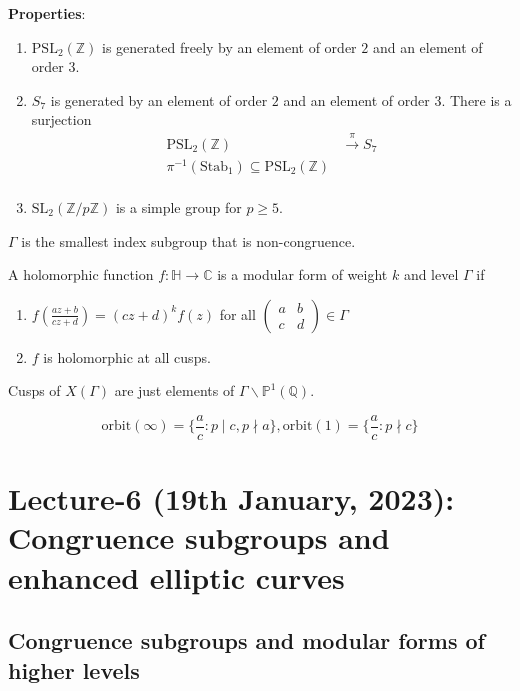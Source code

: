 \documentclass[oneside, 12pt]{scrbook}
\newcommand{\CC}{\mathbb C}
\newcommand{\QQ}{\mathbb Q}
\newcommand{\ZZ}{\mathbb Z}
\newcommand{\PP}{\mathbb{P}}
\newcommand{\SL}{\mathrm{SL}}
\theoremstyle{theorem}
\begin{document}
\textbf{Properties}:
\begin{enumerate}
\item $\mathrm{PSL}_{2}(\ZZ)$ is generated freely by an element of order $2$ and an element of order $3$.
\item $S_{7}$ is generated by an element of order $2$ and an element of order $3$. There is a surjection 
\begin{align*}
\mathrm{PSL}_{2}(\ZZ) &\xrightarrow{\pi} S_{7} \\
\pi^{-1}(\mathrm{Stab}_{1}) \subseteq \mathrm{PSL}_{2}(\ZZ) \\
\end{align*}
\item $\SL_{2}(\ZZ/p\ZZ)$ is a simple group for $p \geq 5$.
\end{enumerate}

\begin{remark}
$\Gamma$ is the smallest index subgroup that is non-congruence.
\end{remark}

\begin{definition}
A holomorphic function $f: \mathbb{H} \rightarrow \CC$ is a modular form of weight $k$ and level $\Gamma$ if 
\begin{enumerate}
\item $f\left(\frac{az+b}{cz+d}\right) = (cz+d)^k f(z)$ for all $\begin{pmatrix}
a & b \\ c & d
\end{pmatrix} \in \Gamma$
\item $f$ is holomorphic at all cusps.
\end{enumerate}
Cusps of $X(\Gamma)$ are just elements of $\Gamma \backslash \PP^1 (\QQ)$.
\end{definition}

\begin{proposition}
$$\mathrm{orbit}(\infty) = \{ \frac{a}{c}: p\mid c , p \nmid a\}, \mathrm{orbit}(1) = \{ \frac{a}{c}:p \nmid c\}$$
\end{proposition}

\chapter{Lecture-6 (19th January, 2023): Congruence subgroups and enhanced elliptic curves}

\section{Congruence subgroups and modular forms of higher levels}
\end{document}
